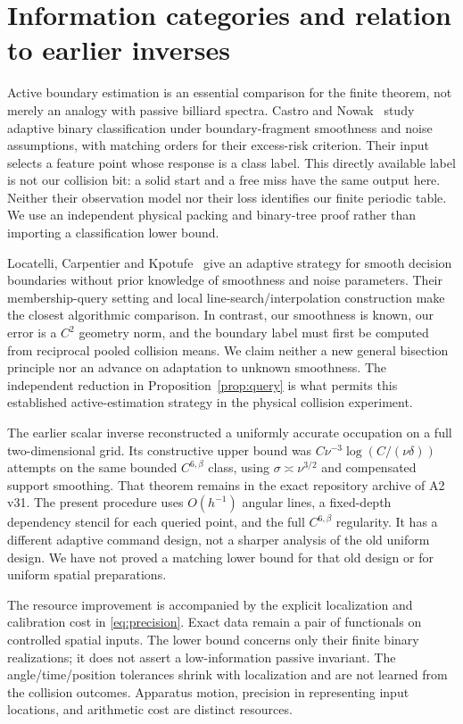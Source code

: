 \section{Information categories and relation to earlier inverses}
\label{sec:comparison}
Active boundary estimation is an essential comparison for the finite
theorem, not merely an analogy with passive billiard spectra.
Castro and Nowak~\cite{CN} study adaptive binary classification under
boundary-fragment smoothness and noise assumptions, with matching
orders for their excess-risk criterion. Their input selects a feature
point whose response is a class label. This directly available label
is not our collision bit: a solid start and a free miss have the same
output here. Neither their observation model nor their loss identifies
our finite periodic table. We use an independent physical packing and
binary-tree proof rather than importing a classification lower bound.

Locatelli, Carpentier and Kpotufe~\cite{LCK} give an adaptive strategy
for smooth decision boundaries without prior knowledge of smoothness
and noise parameters. Their membership-query setting and local
line-search/interpolation construction make the closest algorithmic
comparison. In contrast, our smoothness is known, our error is a $C^2$
geometry norm, and the boundary label must first be computed from
reciprocal pooled collision means. We claim neither a new general
bisection principle nor an advance on adaptation to unknown smoothness.
The independent reduction in Proposition~\ref{prop:query} is what
permits this established active-estimation strategy in the physical
collision experiment.

The earlier scalar inverse reconstructed a uniformly accurate occupation
on a full two-dimensional grid. Its constructive upper bound was
$C\nu^{-3}\log(C/(\nu\delta))$ attempts on the same bounded
$C^{6,\beta}$ class, using $\sigma\asymp\nu^{3/2}$ and compensated
support smoothing. That theorem remains in the exact repository archive of A2 v31. The present
procedure uses $O(h^{-1})$ angular lines, a fixed-depth dependency
stencil for each queried point, and the full $C^{6,\beta}$ regularity.
It has a different adaptive command design, not a sharper analysis of
the old uniform design. We have not proved a matching lower bound
for that old design or for uniform spatial preparations.

The resource improvement is accompanied by the explicit localization
and calibration cost in \eqref{eq:precision}. Exact data remain a pair
of functionals on controlled spatial inputs. The lower bound concerns
only their finite binary realizations; it does not assert a low-information
passive invariant. The angle/time/position tolerances shrink with
localization and are not learned from the collision outcomes. Apparatus
motion, precision in representing input locations, and arithmetic
cost are distinct resources.

